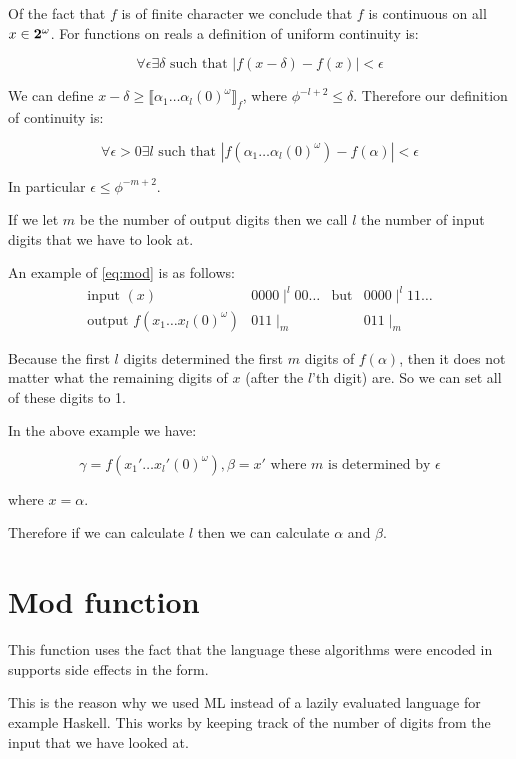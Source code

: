 \documentclass{cs4rep}
\begin{document}
Of the fact that $f$ is of finite character we conclude that $f$ is
continuous on all $x \in {\bf 2}^{\omega}$. For functions on reals a
definition of uniform continuity is:

\[ \forall \epsilon \exists \delta \mbox{ such that } |f(x-\delta) - f(x)| < \epsilon \]

We can define $x-\delta \geq \llbracket \alpha_{1} \ldots
\alpha_{l} (0)^{\omega} \rrbracket_{f}$, where $\phi^{-l+2} \leq \delta $.
Therefore our definition of continuity is:

\begin{equation} \label{eq:mod}
\forall \epsilon > 0 \exists l \mbox{ such that } |f(\alpha_{1} \ldots \alpha_{l} (0)^{\omega}) - f(\alpha)| < \epsilon 
\end{equation}

In particular $\epsilon \leq \phi^{-m+2}$.

If we let $m$ be the number of output digits then we call $l$ the
number of input digits that we have to look at.

An example of \ref{eq:mod} is as follows:
\[\begin{array}{c||l|rl}
  \mbox{input } (x) & 0000 \mid^{l} 00 \ldots & \mbox{but} 
& 0000 \mid^{l} 11 \ldots \\ \hline
  \mbox{output } f(x_{1} \ldots x_{l} (0)^{\omega}) & 011 \mid_{m} & & 011 \mid_{m} 
\end{array}\]

Because the first $l$ digits determined the first $m$ digits of
$f(\alpha)$, then it does not matter what the remaining digits of $x$
(after the $l$'th digit) are. So we can set all of these digits to 1.

In the above example we have:

\[ \gamma = f(x_{1}' \ldots x_{l}' (0)^{\omega}), \beta = x' \mbox{ where } m \mbox{ is determined by } \epsilon \]

where $x = \alpha$.

Therefore if we can calculate $l$ then we can calculate $\alpha$ and
$\beta$.

\section{Mod function}
This function uses the fact that the language these algorithms were
encoded in supports side effects in the form.

This is the reason why we used ML instead of a lazily evaluated
language for example Haskell. This works by keeping track of the
number of digits from the input that we have looked at.
\end{document}
